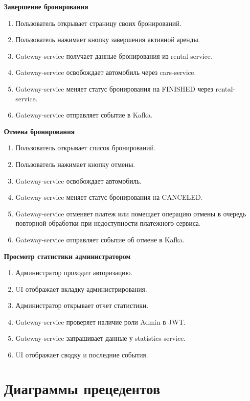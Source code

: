 \textbf{Завершение бронирования}
\begin{enumerate}
	\item Пользователь открывает страницу своих бронирований.
	\item Пользователь нажимает кнопку завершения активной аренды.
	\item Gateway-service получает данные бронирования из rental-service.
	\item Gateway-service освобождает автомобиль через cars-service.
	\item Gateway-service меняет статус бронирования на FINISHED через rental-service.
	\item Gateway-service отправляет событие в Kafka.
\end{enumerate}

\textbf{Отмена бронирования}
\begin{enumerate}
	\item Пользователь открывает список бронирований.
	\item Пользователь нажимает кнопку отмены.
	\item Gateway-service освобождает автомобиль.
	\item Gateway-service меняет статус бронирования на CANCELED.
	\item Gateway-service отменяет платеж или помещает операцию отмены в очередь повторной обработки при недоступности платежного сервиса.
	\item Gateway-service отправляет событие об отмене в Kafka.
\end{enumerate}

\textbf{Просмотр статистики администратором}
\begin{enumerate}
	\item Администратор проходит авторизацию.
	\item UI отображает вкладку администрирования.
	\item Администратор открывает отчет статистики.
	\item Gateway-service проверяет наличие роли Admin в JWT.
	\item Gateway-service запрашивает данные у statistics-service.
	\item UI отображает сводку и последние события.
\end{enumerate}

\section{Диаграммы прецедентов}

